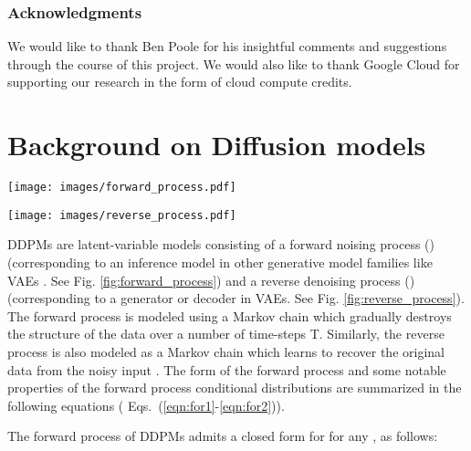 \documentclass[10pt]{article} \usepackage[accepted]{tmlr}
\begin{document}
\subsubsection*{Acknowledgments}
We would like to thank Ben Poole for his insightful comments and suggestions through the course of this project. We would also like to thank Google Cloud for supporting our research in the form of cloud compute credits.




\newpage

\appendix
\section{Background on Diffusion models}
\label{sec:appendix_a}

\begin{figure*}
  \centering
  \begin{minipage}{0.45\linewidth}
    \texttt{[image: images/forward\_process.pdf]}
    \caption{Forward Process}
    \label{fig:forward_process}
  \end{minipage}
  \hfill
  \begin{minipage}{0.45\linewidth}
    \texttt{[image: images/reverse\_process.pdf]}
    \caption{Reverse Process}
    \label{fig:reverse_process}
  \end{minipage}
\end{figure*}

DDPMs \citep{sohldickstein2015deep, ho2020denoising} are latent-variable models consisting of a forward noising process () (corresponding to an inference model in other generative model families like VAEs \citep{kingma2014autoencoding, rezende2016variational}. See Fig. \ref{fig:forward_process}) and a reverse denoising process () (corresponding to a generator or decoder in VAEs. See Fig. \ref{fig:reverse_process}). The forward process is modeled using a Markov chain which gradually destroys the structure of the data  over a number of time-steps T. Similarly, the reverse process is also modeled as a Markov chain which learns to recover the original data  from the noisy input . The form of the forward process and some notable properties of the forward process conditional distributions are summarized in the following equations ( Eqs.~(\ref{eqn:for1}-\ref{eqn:for2})).



The forward process of DDPMs admits a closed form for  for any , as follows:
\end{document}
